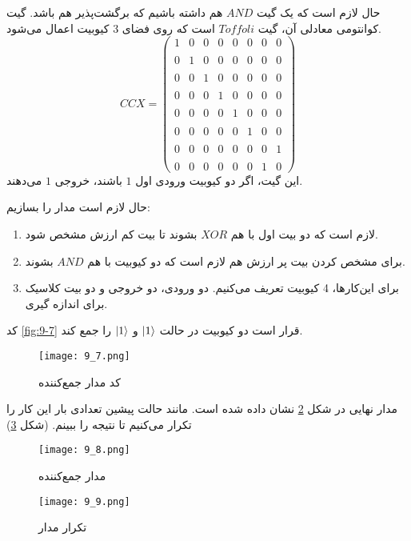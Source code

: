 حال لازم است که یک گیت $AND$ هم داشته باشیم که برگشت‌پذیر هم باشد. گیت کوانتومی معادلی آن، گیت $Toffoli$ است  که روی فضای $3$ کیوبیت اعمال می‌شود. 
\begin{equation}
	CCX = \begin{pmatrix}
	1 & 0 & 0 & 0 & 0 & 0 & 0 & 0 \\ \\
	0 & 1 & 0 & 0 & 0 & 0 & 0 & 0 \\ \\
	0 & 0 & 1 & 0 & 0 & 0 & 0 & 0 \\ \\
	0 & 0 & 0 & 1 & 0 & 0 & 0 & 0 \\ \\
	0 & 0 & 0 & 0 & 1 & 0 & 0 & 0 \\ \\
	0 & 0 & 0 & 0 & 0 & 1 & 0 & 0 \\ \\
	0 & 0 & 0 & 0 & 0 & 0 & 0 & 1 \\ \\
	0 & 0 & 0 & 0 & 0 & 0 & 1 & 0
	\end{pmatrix}
\end{equation}
این گیت، اگر دو کیوبیت ورودی اول $1$ باشند، خروجی $1$ می‌دهند. 

حال لازم است مدار را بسازیم:
\begin{enumerate}
	\item لازم است که دو بیت اول با هم $XOR$ بشوند تا بیت کم ارزش مشخص شود.
	\item  برای مشخص کردن بیت پر ارزش هم لازم است که دو کیوبیت با هم $AND$ بشوند. 
	 \item برای این‌کار‌ها، 4 کیوبیت تعریف می‌کنیم. دو ورودی، دو خروجی و دو بیت کلاسیک برای اندازه گیری.   
\end{enumerate}
کد \autoref{fig:9-7} قرار است دو کیوبیت در حالت  $\ket{1}$ و $\ket{1}$ را جمع کند. 
\begin{figure}[h]
	\caption{کد مدار جمع‌کننده }
	\centering
	\texttt{[image: 9\_7.png]}
	\label{fig:9-7}
\end{figure}
مدار نهایی در شکل \ref{fig:9-8} نشان داده شده است. مانند حالت پیشین تعدادی بار این کار را تکرار می‌کنیم تا نتیجه را ببینم. (شکل \ref{fig:9-9})
\begin{figure}[h]
	\caption{مدار جمع‌کننده}
	\centering
	\texttt{[image: 9\_8.png]}
	\label{fig:9-8}
\end{figure}
\begin{figure}[h]
	\caption{تکرار مدار}
	\centering
	\texttt{[image: 9\_9.png]}
	\label{fig:9-9}
\end{figure}

